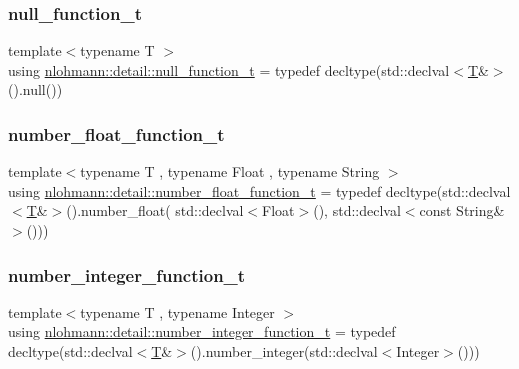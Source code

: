 \subsubsection{\texorpdfstring{null\_function\_t}{null\_function\_t}}
{\footnotesize\ttfamily template$<$typename T $>$ \\
using \mbox{\hyperlink{namespacenlohmann_1_1detail_ac1b4e524746bf8b790b2b776048b93c4}{nlohmann\+::detail\+::null\+\_\+function\+\_\+t}} = typedef decltype(std\+::declval$<$\mbox{\hyperlink{_keyboard_event_8h_adf1f3edb9115acb0a1e04209b7a9937b}{T}}\&$>$().null())}

\mbox{\label{namespacenlohmann_1_1detail_ad42df56e913abe26ed556e0e92f386f4}} 
\subsubsection{\texorpdfstring{number\_float\_function\_t}{number\_float\_function\_t}}
{\footnotesize\ttfamily template$<$typename T , typename Float , typename String $>$ \\
using \mbox{\hyperlink{namespacenlohmann_1_1detail_ad42df56e913abe26ed556e0e92f386f4}{nlohmann\+::detail\+::number\+\_\+float\+\_\+function\+\_\+t}} = typedef decltype(std\+::declval$<$\mbox{\hyperlink{_keyboard_event_8h_adf1f3edb9115acb0a1e04209b7a9937b}{T}}\&$>$().number\+\_\+float( std\+::declval$<$Float$>$(), std\+::declval$<$const String\&$>$()))}

\mbox{\label{namespacenlohmann_1_1detail_a4a3e14a011b9ea1ff849fc6d2411e6a0}} 
\subsubsection{\texorpdfstring{number\_integer\_function\_t}{number\_integer\_function\_t}}
{\footnotesize\ttfamily template$<$typename T , typename Integer $>$ \\
using \mbox{\hyperlink{namespacenlohmann_1_1detail_a4a3e14a011b9ea1ff849fc6d2411e6a0}{nlohmann\+::detail\+::number\+\_\+integer\+\_\+function\+\_\+t}} = typedef decltype(std\+::declval$<$\mbox{\hyperlink{_keyboard_event_8h_adf1f3edb9115acb0a1e04209b7a9937b}{T}}\&$>$().number\+\_\+integer(std\+::declval$<$Integer$>$()))}

